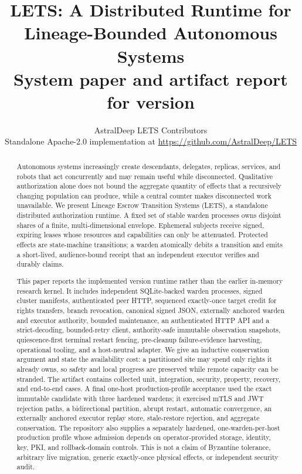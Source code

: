\documentclass[10pt]{article}
\title{\vspace{-1.5em}\textbf{LETS: A Distributed Runtime for\\Lineage-Bounded Autonomous Systems}\\[0.55em]
\large System paper and artifact report for version \ArtifactVersion}
\author{AstralDeep LETS Contributors\\
\small Standalone Apache-2.0 implementation at \url{https://github.com/AstralDeep/LETS}}
\date{\EvidenceDate}
\newcommand{\LETS}{\textsc{LETS}}
\begin{document}
\maketitle

\begin{abstract}
Autonomous systems increasingly create descendants, delegates, replicas, services, and robots
that act concurrently and may remain useful while disconnected. Qualitative authorization alone
does not bound the aggregate quantity of effects that a recursively changing population can
produce, while a central counter makes disconnected work unavailable. We present Lineage Escrow
Transition Systems (\LETS), a standalone distributed authorization runtime. A fixed set of stable
warden processes owns disjoint shares of a finite, multi-dimensional envelope. Ephemeral subjects
receive signed, expiring leases whose resources and capabilities can only be attenuated. Protected
effects are state-machine transitions; a warden atomically debits a transition and emits a
short-lived, audience-bound receipt that an independent executor verifies and durably claims.

This paper reports the implemented version \ArtifactVersion{} runtime rather than the earlier
in-memory research kernel. It includes independent SQLite-backed warden processes, signed cluster
manifests, authenticated peer HTTP, sequenced exactly-once target credit for rights transfers,
branch revocation, canonical signed JSON, externally anchored warden and executor authority,
bounded maintenance, an authenticated HTTP API and a strict-decoding, bounded-retry client,
authority-safe immutable observation snapshots, quiescence-first terminal restart fencing,
pre-cleanup failure-evidence harvesting, operational tooling, and a host-neutral adapter. We give an inductive
conservation argument and state the availability cost:
a partitioned site may spend only rights it already owns, so safety and local progress are
preserved while remote capacity can be stranded. The artifact contains \CoreTestsCollected{}
collected unit, integration, security, property, recovery, and end-to-end cases. A final one-host
production-profile acceptance used the exact immutable candidate with three hardened wardens; it
exercised mTLS and JWT rejection paths, a bidirectional partition, abrupt restart, automatic
convergence, an externally anchored executor replay store, stale-restore rejection, and aggregate
conservation. The repository also supplies a separately hardened,
one-warden-per-host production profile whose admission depends on operator-provided storage,
identity, key, PKI, and rollback-domain controls. This is not a claim of Byzantine tolerance,
arbitrary live migration, generic exactly-once physical effects, or independent security audit.
\end{abstract}
\end{document}
